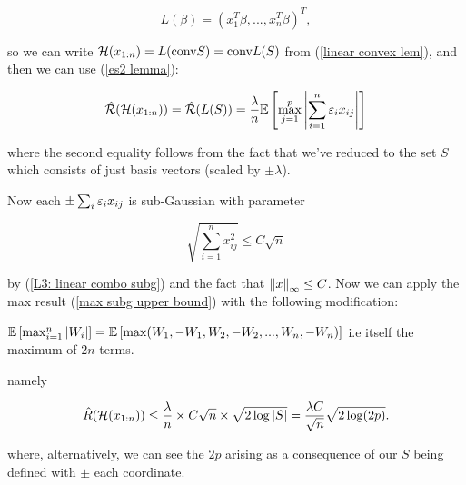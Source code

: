 \documentclass[11pt]{scrartcl}
\begin{document}
\begin{equation}
    L(\beta) = ( x_1^T\beta, ... , x_n^T\beta )^T,
\end{equation}

so we can write $\mathcal{H}(x_{1:n}) = L(\text{conv} S) = \text{conv} L(S)$ from (\ref{linear convex lem}), and then we can use (\ref{es2 lemma}):

\begin{equation}
    \hat{\mathcal{R}}(\mathcal{H}(x_{1:n})) = \hat{\mathcal{R}}(L(S)) = \frac{\lambda}{n} \mathbb{E} \left[  \max_{j=1}^p \left\lvert \sum_{i=1}^n \varepsilon_i x_{ij} \right\rvert \right]
\end{equation}

where the second equality follows from the fact that we've reduced to the set $S$ which consists of just basis vectors (scaled by $\pm \lambda$).

Now each $\pm \sum_i \varepsilon_i x_{ij}$ is sub-Gaussian with parameter

\begin{equation}
    \sqrt{ \sum_{i=1}^n x_{ij}^2 } \le C \sqrt{n}
\end{equation}

by (\ref{L3: linear combo subg}) and the fact that $\left\lVert x\right\rVert_\infty \le C$. Now we can apply the max result (\ref{max subg upper bound}) with the following modification:

\begin{theorem}

$\mathbb{E} \left[ \max_{i=1}^n |W_i| \right] = \mathbb{E} \left[  \max(W_1, -W_1, W_2, -W_2, ... ,W_n,-W_n)  \right] $ i.e itself the maximum of $2n$ terms.
\end{theorem}

namely

\begin{equation}
    \hat{R}(\mathcal{H}(x_{1:n})) \le \frac{\lambda}{n} \times C \sqrt{n} \times \sqrt{2 \log |S|} = \frac{\lambda C}{\sqrt{n}} \sqrt{2 \log (2p)}.
\end{equation}

where, alternatively, we can see the $2p$ arising as a consequence of our $S$ being defined with $\pm$ each coordinate.
 

\end{document}
